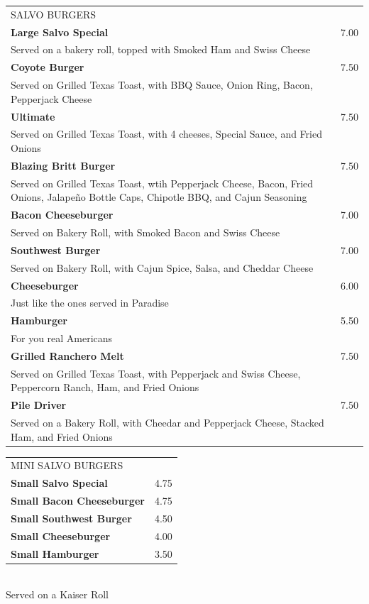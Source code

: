 \documentclass[10pt,notitlepage]{article}
\makeatletter
\newcommand*\ColText[1]{\uppercase{#1}}
\newenvironment{Group}[1]
	{\noindent\begin{tabular*}{\textwidth}{@{}p{.8\linewidth}@{\extracolsep{\fill}}r@{}}
		{\fontsize{16}{20}\selectfont\ColText{#1}}\\[0.8em]}
	{\end{tabular*}}
\newcommand*\Item[2]{%
	\sffamily\textbf{#1}\dotfill & #2}
\newcommand*\Desc[1]{%
	\sffamily\hspace*{1em}\footnotesize #1}
\makeatother
\begin{document}
\thispagestyle{first}
	
	\begin{Group}{Salvo Burgers}
		\Item{Large Salvo Special}{7.00} \\
		\Desc{Served on a bakery roll, topped with Smoked Ham and Swiss Cheese} \\
		\Item{Coyote Burger}{7.50} \\
		\Desc{Served on Grilled Texas Toast, with BBQ Sauce, Onion Ring, Bacon, Pepperjack Cheese} \\
		\Item{Ultimate}{7.50} \\
		\Desc{Served on Grilled Texas Toast, with 4 cheeses, Special Sauce, and Fried Onions} \\
		\Item{Blazing Britt Burger}{7.50} \\
		\Desc{Served on Grilled Texas Toast, wtih Pepperjack Cheese, Bacon, Fried Onions, Jalape\~{n}o Bottle Caps, Chipotle BBQ, and Cajun Seasoning} \\
		\Item{Bacon Cheeseburger}{7.00} \\
		\Desc{Served on Bakery Roll, with Smoked Bacon and Swiss Cheese} \\
		\Item{Southwest Burger}{7.00} \\
		\Desc{Served on Bakery Roll, with Cajun Spice, Salsa, and Cheddar Cheese} \\
		\Item{Cheeseburger}{6.00} \\
		\Desc{Just like the ones served in Paradise} \\
		\Item{Hamburger}{5.50} \\
		\Desc{For you real Americans} \\
		\Item{Grilled Ranchero Melt}{7.50} \\
		\Desc{Served on Grilled Texas Toast, with Pepperjack and Swiss Cheese, Peppercorn Ranch, Ham, and Fried Onions} \\
		\Item{Pile Driver}{7.50} \\
		\Desc{Served on a Bakery Roll, with Cheedar and Pepperjack Cheese, Stacked Ham, and Fried Onions} \\
	\end{Group}
	
	\vfill{}
	
	\begin{Group}{Mini Salvo Burgers}
		\Item{Small Salvo Special}{4.75} \\
		\Item{Small Bacon Cheeseburger}{4.75} \\
		\Item{Small Southwest Burger}{4.50} \\
		\Item{Small Cheeseburger}{4.00} \\
		\Item{Small Hamburger}{3.50} \\
	\end{Group}
	\\[\baselineskip]
	\centering Served on a Kaiser Roll \\
	
\end{document}
